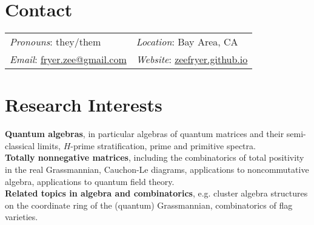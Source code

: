\documentclass[margin]{res} %
\begin{document}
\begin{resume}


\section{\sc Contact}

\begin{tabular}{@{} p{5cm} p{6cm}}

{\em Pronouns}: they/them & {\em Location}: Bay Area, CA \\
{\em Email}: \url{fryer.zee@gmail.com} & {\em Website}: \url{zeefryer.github.io} \\
\end{tabular}




\section{\sc Research Interests}  

\textbf{Quantum algebras}, in particular algebras of quantum matrices and their semi-classical limits, $H$-prime stratification, prime and primitive spectra.\\[0.3em]
\textbf{Totally nonnegative matrices}, including the combinatorics of total positivity in the real Grassmannian, Cauchon-Le diagrams, applications to noncommutative algebra, applications to quantum field theory.\\[0.3em]
\textbf{Related topics in algebra and combinatorics}, e.g. cluster algebra structures on the coordinate ring of the (quantum) Grassmannian, combinatorics of flag varieties.



\end{resume}
\end{document}
